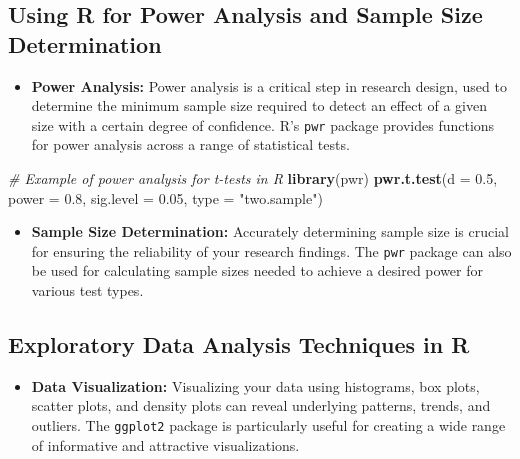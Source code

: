 \documentclass[
]{book}
\newenvironment{Shaded}{\begin{snugshade}}{\end{snugshade}}
\newcommand{\AttributeTok}[1]{\textcolor[rgb]{0.13,0.29,0.53}{#1}}
\newcommand{\CommentTok}[1]{\textcolor[rgb]{0.56,0.35,0.01}{\textit{#1}}}
\newcommand{\FloatTok}[1]{\textcolor[rgb]{0.00,0.00,0.81}{#1}}
\newcommand{\FunctionTok}[1]{\textcolor[rgb]{0.13,0.29,0.53}{\textbf{#1}}}
\newcommand{\NormalTok}[1]{#1}
\newcommand{\StringTok}[1]{\textcolor[rgb]{0.31,0.60,0.02}{#1}}
\providecommand{\tightlist}{%
  \setlength{\itemsep}{0pt}\setlength{\parskip}{0pt}}
\begin{document}
\hypertarget{using-r-for-power-analysis-and-sample-size-determination}{%
\subsection*{Using R for Power Analysis and Sample Size Determination}\label{using-r-for-power-analysis-and-sample-size-determination}}

\begin{itemize}
\tightlist
\item
  \textbf{Power Analysis:} Power analysis is a critical step in research design, used to determine the minimum sample size required to detect an effect of a given size with a certain degree of confidence. R's \texttt{pwr} package provides functions for power analysis across a range of statistical tests.
\end{itemize}

\begin{Shaded}
\begin{Highlighting}[]
\CommentTok{\# Example of power analysis for t{-}tests in R}
\FunctionTok{library}\NormalTok{(pwr)}
\FunctionTok{pwr.t.test}\NormalTok{(}\AttributeTok{d =} \FloatTok{0.5}\NormalTok{, }\AttributeTok{power =} \FloatTok{0.8}\NormalTok{, }\AttributeTok{sig.level =} \FloatTok{0.05}\NormalTok{, }\AttributeTok{type =} \StringTok{"two.sample"}\NormalTok{)}
\end{Highlighting}
\end{Shaded}

\begin{itemize}
\tightlist
\item
  \textbf{Sample Size Determination:} Accurately determining sample size is crucial for ensuring the reliability of your research findings. The \texttt{pwr} package can also be used for calculating sample sizes needed to achieve a desired power for various test types.
\end{itemize}

\hypertarget{exploratory-data-analysis-techniques-in-r}{%
\subsection*{Exploratory Data Analysis Techniques in R}\label{exploratory-data-analysis-techniques-in-r}}

\begin{itemize}
\tightlist
\item
  \textbf{Data Visualization:} Visualizing your data using histograms, box plots, scatter plots, and density plots can reveal underlying patterns, trends, and outliers. The \texttt{ggplot2} package is particularly useful for creating a wide range of informative and attractive visualizations.
\end{itemize}
\end{document}
